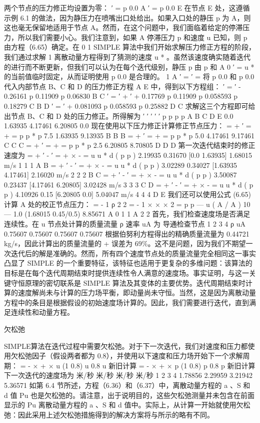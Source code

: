 \documentclass[11pt,a4paper,openany,fontset=none]{ctexbook}
\begin{document}
两个节点的压力修正均设置为零： ′ = p 0.0 A ′ = p 0.0 E 在节点 E 处，这遵循示例 6.1 的做法，因为静压力在喷嘴出口处给出。如果入口处的静压 p 为 A，则这也毫无保留地适用于节点 A。然而，在这个问题中，我们面临着给定的停滞压力，所以我们需要小心。我们注意到，如果 A 停滞压力 p 和速度 u 已知，则 p 由方程（6.65）确定。在 0 1 SIMPLE 算法中我们开始求解压力修正方程的阶段，我们通过求解 1 离散动量方程得到了猜测的速度 u * 。虽然该速度确实随着迭代的进行而不断更新，但我们可以认为在每个迭代级别，静压 p 由 p 和 A 0 ′ = u * 的当前值临时固定，从而证明使用 p 0.0 是合理的。 1 A ′ = ′ = 将 p 0.0 和 p 0.0 代入内部节点 B、C 和 D 的压力修正方程 A E 中，得到以下方程组： ′ = ′ - 0.26161 p 0.11909 p 0.06830 B C ′ = ′ + ′ + 0.17769 p 0.11909 p 0.058593 p 0.18279 C B D ′ = ′ + 0.081093 p 0.058593 p 0.25882 D C 求解这三个方程即可给出节点 B、C 和 D 处的压力修正。所得解为
′ ′ ′ ′ ′ p p p p A B C D E 0.0 1.63935 4.17461 6.20805 0.0
现在使用以下压力修正计算修正节点压力： = + ′ = + = p p * p 7.5 1.63935 9.13935 B B B = + ′ = + = p p * p 5.0 4.17461 9.17461 C C C = + ′ = + = p p * p 2.5 6.20805 8.70805 D D D 第一次迭代结束时的修正速度为 = + ′ - ′ = + × - = u u * d ( p p ) 2.19935 0.31670 [0.0 1.63935] 1.68015 m/s 1 1 1 A B = + ′ - ′ = + × - = u u * d ( p p ) 3.02289 0.34027 [1.63935 4.17461] 2.16020 m/s 2 2 2 B C = + ′ - ′ = + × - = u u * d ( p p ) 3.50087 0.23437 [4.17461 6.20805] 3.02428 m/s 3 3 3 C D = + ′ - ′ = + × - = u u * d ( p p ) 4.10926 0.15 [6.20805 0.0] 5.04047 m/s 4 4 4 D E 我们还可以使用公式 (6.65) 计算 A 处的校正节点压力： = - 1 ρ 2 2 = - 1 × × × 2 = p p — u ( A / A ) 10 — 1.0 (1.68015 0.45/0.5) 8.85671 A 0 1 1 A 2 2
首先，我们检查速度场是否满足连续性。在 u 节点处计算的质量流量 ρ 速率 uA 为
导通检查节点 1 2 3 4 ρ uA 0.75607 0.75607 0.75607 0.75607
根据伯努利方程得出的精确质量流量为 0.44721 kg/s，因此计算出的质量流量的 + 误差为 69\%。这不是问题，因为我们不期望一次迭代后的解是准确的。然而，所有四个速度节点处的质量流量完全相同这一事实凸显了 SIMPLE 的一个重要特征，该特征也适用于更复杂的多维问题：该算法的目标是在每个迭代周期结束时提供连续性令人满意的速度场。事实证明，与这一关键守恒原理的密切联系是 SIMPLE 算法及其变体的主要优势。迭代周期结束时计算的速度解尚未与计算的压力场平衡，即动量尚未守恒。当然，这是因为离散动量方程中的条目是根据假设的初始速度场计算的。因此，我们需要进行迭代，直到满足连续性和动量方程。

欠松弛

SIMPLE算法在迭代过程中需要欠松弛。对于下一次迭代，我们对速度和压力都使用欠松弛因子（假设两者都为 0.8），并使用以下速度和压力场开始下一个求解周期： = - × + × u (1 0.8) u 0.8 u 新旧计算 = - × + × p (1 0.8) p 0.8 p 新旧计算 下一次迭代的速度场为
米/秒 米/秒 米/秒 米/秒 1 2 3 4 1.78856 2.29959 3.21942 5.36571
如第 6.4 节所述，方程（6.36）和（6.37）中，离散动量方程的 a 、S 和 d 值 Pu 也是欠松弛的。请注意，出于说明目的，这些欠松弛测量并未包含在前面显示的 Pu 离散动量方程的 a 、S 和 d 值中。实际上，从计算一开始就使用欠松弛：因此采用上述欠松弛措施得到的解决方案将与所示的略有不同。
\end{document}
